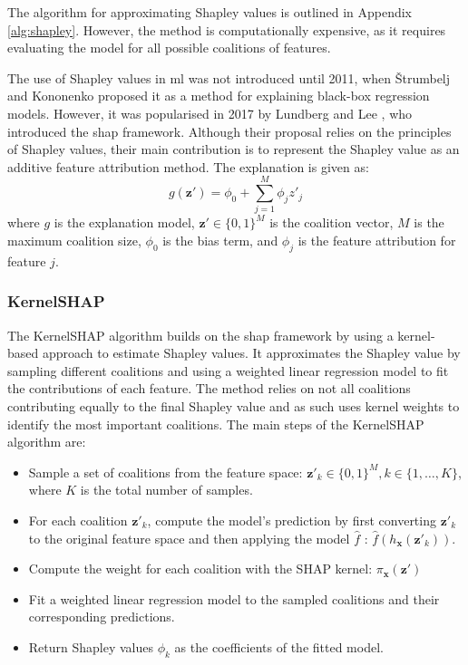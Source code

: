 The algorithm for approximating Shapley values is outlined in Appendix \ref{alg:shapley}. However, the method is computationally expensive, as it requires evaluating the model for all possible coalitions of features.

The use of Shapley values in \acrshort{ml} was not introduced until 2011, when Štrumbelj and Kononenko \cite{Strumbelj2011} proposed it as a method for explaining black-box regression models. However, it was popularised in 2017 by Lundberg and Lee \cite{Lundberg2017}, who introduced the \acrshort{shap} framework. Although their proposal relies on the principles of Shapley values, their main contribution is to represent the Shapley value as an additive feature attribution method. The explanation is given as:
\begin{equation}
    g(\mathbf{z}') = \phi_0 + \sum_{j=1}^{M} \phi_j z'_j
\end{equation}
where $g$ is the explanation model, $\mathbf{z}' \in \{0,1\}^M$ is the coalition vector, $M$ is the maximum coalition size, $\phi_0$ is the bias term, and $\phi_j$ is the feature attribution for feature $j$.

\subsubsection{KernelSHAP} \label{sec:kernelshap}

The KernelSHAP algorithm builds on the \acrshort{shap} framework by using a kernel-based approach to estimate Shapley values. It approximates the Shapley value by sampling different coalitions and using a weighted linear regression model to fit the contributions of each feature. The method relies on not all coalitions contributing equally to the final Shapley value and as such uses kernel weights to identify the most important coalitions. The main steps of the KernelSHAP algorithm are:
\begin{itemize}
    \item Sample a set of coalitions from the feature space: $\mathbf{z}'_k \in \{0,1\}^M, k \in \{1, \ldots, K\}$, where $K$ is the total number of samples.
    \item For each coalition $\mathbf{z}'_k$, compute the model's prediction by first converting $\mathbf{z}'_k$ to the original feature space and then applying the model $\hat{f}$ : $\hat{f}\left(h_\mathbf{x}\left(\mathbf{z}'_k\right)\right)$.
    \item Compute the weight for each coalition with the SHAP kernel: $\pi_\mathbf{x} (\mathbf{z}')$ 
    \item Fit a weighted linear regression model to the sampled coalitions and their corresponding predictions.
    \item Return Shapley values $\phi_k$ as the coefficients of the fitted model.
\end{itemize}

